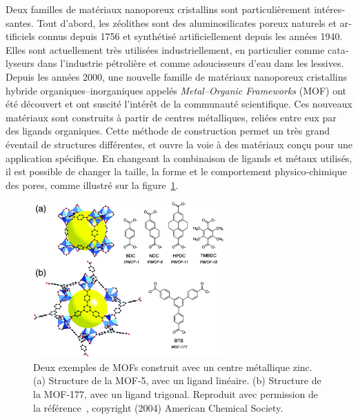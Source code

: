 \documentclass[thesis]{subfiles}
\begin{document}
\begin{otherlanguage}{french}
Deux familles de matériaux nanoporeux cristallins sont particulièrement
intéressantes. Tout d'abord, les zéolithes sont des aluminosilicates poreux
naturels et artificiels connus depuis 1756 et synthétisé artificiellement depuis
les années 1940. Elles sont actuellement très utilisées industriellement, en
particulier comme catalyseurs dans l'industrie pétrolière et comme adoucisseurs
d'eau dans les lessives. Depuis les années 2000, une nouvelle famille de
matériaux nanoporeux cristallins hybride organiques--inorganiques appelés
\emph{Metal--Organic Frameworks} (MOF) ont été découvert et ont suscité
l'intérêt de la communauté scientifique. Ces nouveaux matériaux sont construits
à partir de centres métalliques, reliées entre eux par des ligands organiques.
Cette méthode de construction permet un très grand éventail de structures
différentes, et ouvre la voie à des matériaux conçu pour une application
spécifique. En changeant la combinaison de ligands et métaux utilisés, il est
possible de changer la taille, la forme et le comportement physico-chimique des
pores, comme illustré sur la figure~\ref{fig:fr:mof-different-linkers}.

\begin{figure}[ht]
    \centering
    \includegraphics[width=0.65\textwidth]{figures/cited/mof-different-linker}
    \caption{Deux exemples de MOFs construit avec un centre métallique zinc.
    (a) Structure de la MOF-5, avec un ligand linéaire. (b) Structure de la
    MOF-177, avec un ligand trigonal. Reproduit avec permission de la
    référence~\cite{Rowsell2004}, copyright (2004) American Chemical Society.}
    \label{fig:fr:mof-different-linkers}
\end{figure}


\end{otherlanguage}
\end{document}
